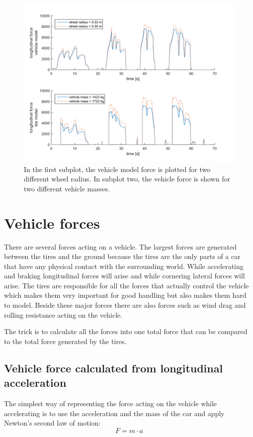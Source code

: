 \begin{figure}[h]
	\centering
	\includegraphics[width=1.0\textwidth]{Pictures/force_diff_re_mass}
	\caption {In the first subplot, the vehicle model force is plotted for two different wheel radius. In subplot two, the vehicle force is shown for two different vehicle masses.}
	\label{force_diff_re_mass}
\end{figure}

\section{Vehicle forces}
There are several forces acting on a vehicle. The largest forces are generated between the tires and the ground because the tires are the only parts of a car that have any physical contact with the surrounding world. While accelerating and braking longitudinal forces will arise and while cornering lateral forces will arise. The tires are responsible for all the forces that actually control the vehicle which makes them very important for good handling but also makes them hard to model. Beside these major forces there are also forces such as wind drag and rolling resistance acting on the vehicle.

The trick is to calculate all the forces into one total force that can be compared to the total force generated by the tires.
\subsection{Vehicle force calculated from longitudinal acceleration}
The simplest way of representing the force acting on the vehicle while accelerating is to use the acceleration and the mass of the car and apply Newton's second law of motion:
\begin{equation}
	F = m \cdot a
\end{equation}
